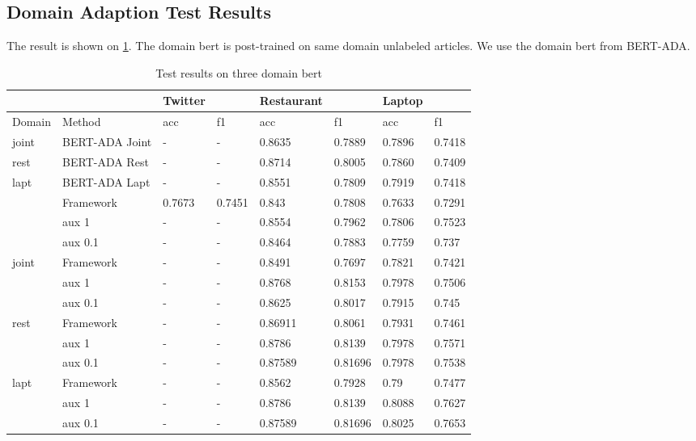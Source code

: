 \documentclass[fyp]{socreport}
\begin{document}
\subsection{Domain Adaption Test Results}

The result is shown on \ref{domain-res}. The domain bert is post-trained on same domain unlabeled articles. We use the domain bert from BERT-ADA\cite{alex2019adapt}.

\begin{table}[h]
    \centering
    \caption{Test results on three domain bert}
    \label{domain-res} 



    \begin{tabular}{llllllll}
    \hline
           &           & Twitter &        & Restaurant &         & Laptop &        \\ \hline
    Domain & Method    & acc      & f1     & acc         & f1      & acc    & f1     \\ \hline

    joint&BERT-ADA Joint  &{-}&{-} &{0.8635}&{0.7889} &{0.7896}&{0.7418} \\ \hline
    rest&BERT-ADA Rest  &{-}&{-} &{0.8714}&{0.8005} &{0.7860}&{0.7409}\\ \hline
    lapt&BERT-ADA Lapt  &{-}&{-} &{0.8551}&{0.7809}&{0.7919}&{0.7418} \\ \hline
    

    
    \midrule
           & Framework & 0.7673   & 0.7451 & 0.843       & 0.7808  & 0.7633 & 0.7291 \\ \hline
           & aux 1     & -        & -      & 0.8554      & 0.7962  & 0.7806 & 0.7523 \\ \hline
           & aux 0.1   & -        & -      & 0.8464      & 0.7883  & 0.7759 & 0.737  \\ \hline
    joint  & Framework & -        & -      & 0.8491      & 0.7697  & 0.7821 & 0.7421 \\ \hline
           & aux 1     & -        & -      & 0.8768      & 0.8153  & 0.7978 & 0.7506 \\ \hline
           & aux 0.1   & -        & -      & 0.8625      & 0.8017  & 0.7915 & 0.745  \\ \hline
           rest    & Framework & -        & -      & 0.86911     & 0.8061  & 0.7931 & 0.7461 \\ \hline
           & aux 1     & -        & -      & 0.8786      & 0.8139  & 0.7978 & 0.7571 \\ \hline
           & aux 0.1   & -        & -      & 0.87589     & 0.81696 & 0.7978 & 0.7538 \\ \hline
    lapt    & Framework & -        & -      & 0.8562      & 0.7928  & 0.79   & 0.7477 \\ \hline
           & aux 1     & -        & -      & 0.8786      & 0.8139  & 0.8088 & 0.7627 \\ \hline
           & aux 0.1   & -        & -      & 0.87589     & 0.81696 & 0.8025 & 0.7653 \\ \hline
    \end{tabular}
    \end{table}
\end{document}
